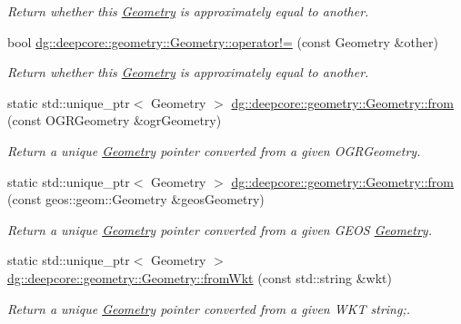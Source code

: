 \begin{DoxyCompactItemize}
\begin{DoxyCompactList}\small\item\em Return whether this \hyperlink{structdg_1_1deepcore_1_1geometry_1_1_geometry}{Geometry} is approximately equal to another. \end{DoxyCompactList}\item 
bool \hyperlink{group___geometry_module_gaf79f2d28ef2c5eae4f3893f82a2dee15}{dg\+::deepcore\+::geometry\+::\+Geometry\+::operator!=} (const Geometry \&other)
\begin{DoxyCompactList}\small\item\em Return whether this \hyperlink{structdg_1_1deepcore_1_1geometry_1_1_geometry}{Geometry} is approximately equal to another. \end{DoxyCompactList}\item 
static std\+::unique\+\_\+ptr$<$ Geometry $>$ \hyperlink{group___geometry_module_ga6113cd54eece79c59ef04c86847a5f33}{dg\+::deepcore\+::geometry\+::\+Geometry\+::from} (const O\+G\+R\+Geometry \&ogr\+Geometry)
\begin{DoxyCompactList}\small\item\em Return a unique \hyperlink{structdg_1_1deepcore_1_1geometry_1_1_geometry}{Geometry} pointer converted from a given O\+G\+R\+Geometry. \end{DoxyCompactList}\item 
static std\+::unique\+\_\+ptr$<$ Geometry $>$ \hyperlink{group___geometry_module_gae52dfa89bd864797db772a72c7eac37b}{dg\+::deepcore\+::geometry\+::\+Geometry\+::from} (const geos\+::geom\+::\+Geometry \&geos\+Geometry)
\begin{DoxyCompactList}\small\item\em Return a unique \hyperlink{structdg_1_1deepcore_1_1geometry_1_1_geometry}{Geometry} pointer converted from a given G\+E\+OS \hyperlink{structdg_1_1deepcore_1_1geometry_1_1_geometry}{Geometry}. \end{DoxyCompactList}\item 
static std\+::unique\+\_\+ptr$<$ Geometry $>$ \hyperlink{group___geometry_module_ga09f1518844b80c4135bfb7f47a227464}{dg\+::deepcore\+::geometry\+::\+Geometry\+::from\+Wkt} (const std\+::string \&wkt)
\begin{DoxyCompactList}\small\item\em Return a unique \hyperlink{structdg_1_1deepcore_1_1geometry_1_1_geometry}{Geometry} pointer converted from a given W\+KT string;. \end{DoxyCompactList}\end{DoxyCompactItemize}


